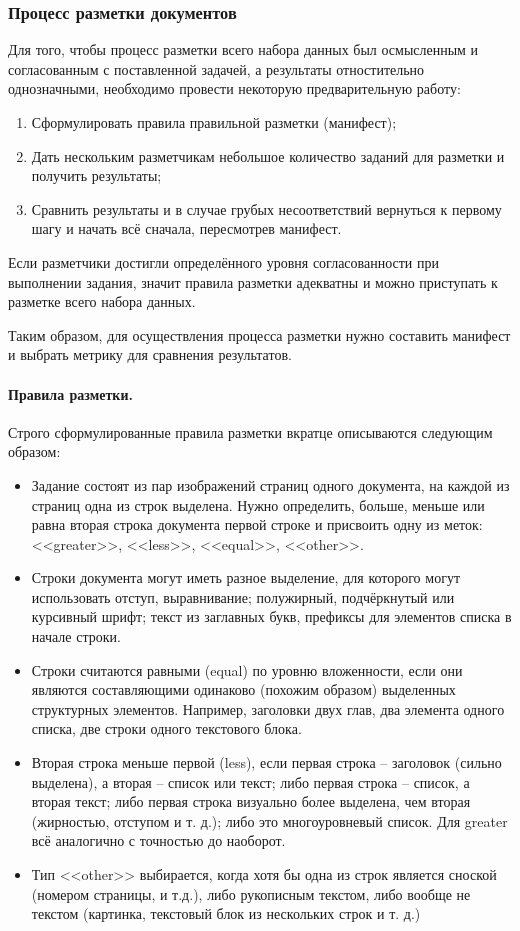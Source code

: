 \subsubsection{Процесс разметки документов}
\label{subsubsec:labelingprocess}

Для того, чтобы процесс разметки всего набора данных был осмысленным и согласованным с поставленной задачей, а результаты отностительно однозначными, необходимо провести некоторую предварительную работу:
\begin{enumerate}
    \item Сформулировать правила правильной разметки (манифест);
    \item Дать нескольким разметчикам небольшое количество заданий для разметки и получить результаты;
    \item Сравнить результаты и в случае грубых несоответствий вернуться к первому шагу и начать всё сначала, пересмотрев манифест.
\end{enumerate}
Если разметчики достигли определённого уровня согласованности при выполнении задания, значит правила разметки адекватны и можно приступать к разметке всего набора данных.

Таким образом, для осуществления процесса разметки нужно составить манифест и выбрать метрику для сравнения результатов.

\paragraph{Правила разметки.} Строго сформулированные правила разметки вкратце описываются следующим образом:
\begin{itemize}
    \item Задание состоят из пар изображений страниц одного документа, на каждой из страниц одна из строк выделена.
    Нужно определить, больше, меньше или равна вторая строка документа первой строке и присвоить одну из меток: <<greater>>, <<less>>, <<equal>>, <<other>>.
    \item Строки документа могут иметь разное выделение, для которого могут использовать отступ, выравнивание; полужирный, подчёркнутый или курсивный шрифт; текст из заглавных букв, префиксы для элементов списка в начале строки.
    \item Строки считаются равными (equal) по уровню вложенности, если они являются составляющими одинаково (похожим образом) выделенных структурных элементов. Например, заголовки двух глав, два элемента одного списка, две строки одного текстового блока.
    \item Вторая строка меньше первой (less), если первая строка – заголовок (сильно выделена), а вторая – список или текст; либо первая строка – список, а вторая текст; либо первая строка визуально более выделена, чем вторая (жирностью, отступом и т. д.); либо это многоуровневый список.
    Для greater всё аналогично с точностью до наоборот.
    \item Тип <<other>> выбирается, когда хотя бы одна из строк является сноской (номером страницы, и т.д.), либо рукописным текстом, либо вообще не текстом (картинка, текстовый блок из нескольких строк и т. д.)
\end{itemize}

